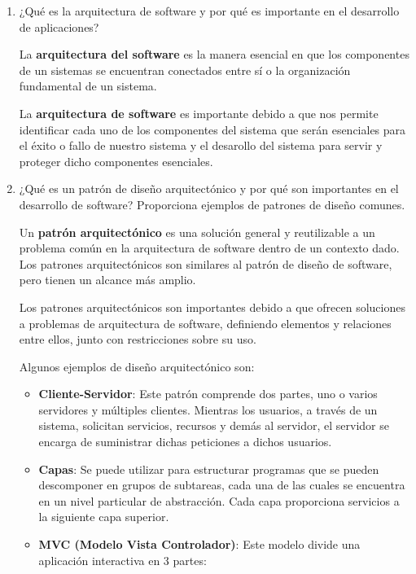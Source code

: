	\begin{enumerate}
		\item ¿Qué es la arquitectura de software y por qué es importante
			en el desarrollo de aplicaciones?

			La \textbf{arquitectura del software} es la manera esencial en
			que los componentes de un sistemas se encuentran conectados
			entre sí o la organización fundamental de un sistema.

			La \textbf{arquitectura de software} es importante debido a que
			nos permite identificar cada uno de los componentes del sistema
			que serán esenciales para el éxito o fallo de nuestro sistema y
			el desarollo del sistema para servir y proteger dicho componentes
			esenciales.

		\item ¿Qué es un patrón de diseño arquitectónico y por qué son importantes
			en el desarrollo de software? Proporciona ejemplos de patrones
			de diseño comunes.

			Un \textbf{patrón arquitectónico} es una solución general y reutilizable
			a un problema común en la arquitectura de software dentro de un
			contexto dado. Los patrones arquitectónicos son similares al
			patrón de diseño de software, pero tienen un alcance más amplio.

			Los patrones arquitectónicos son importantes debido a que ofrecen
			soluciones a problemas de arquitectura de software, definiendo
			elementos y relaciones entre ellos, junto con restricciones sobre
			su uso.

			Algunos ejemplos de diseño arquitectónico son:

			\begin{itemize}
				\item \textbf{Cliente-Servidor}: Este patrón comprende dos partes,
					uno o varios servidores y múltiples clientes. Mientras los usuarios,
					a través de un sistema, solicitan servicios, recursos y
					demás al servidor, el servidor se encarga de suministrar dichas
					peticiones a dichos usuarios.

				\item \textbf{Capas}: Se puede utilizar para estructurar programas
					que se pueden descomponer en grupos de subtareas, cada una
					de las cuales se encuentra en un nivel particular de
					abstracción. Cada capa proporciona servicios a la siguiente
					capa superior.

				\item \textbf{MVC (Modelo Vista Controlador)}: Este modelo divide
					una aplicación interactiva en 3 partes:


\end{itemize}
\end{enumerate}
